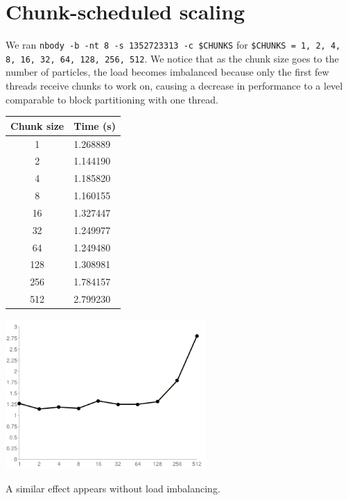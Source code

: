 \documentclass{article}[12pt;letterpaper]
\begin{document}
\section{Chunk-scheduled scaling}

We ran \texttt{nbody -b -nt 8 -s 1352723313 -c \$CHUNKS} for \texttt{\$CHUNKS =
1, 2, 4, 8, 16, 32, 64, 128, 256, 512}. We notice that as the chunk size goes
to the number of particles, the load becomes imbalanced because only the first
few threads receive chunks to work on, causing a decrease in performance to a
level comparable to block partitioning with one thread.

\begin{center}\begin{tabular}{c l}
Chunk size & Time (s) \\
\hline{}
  1 & 1.268889 \\
  2 & 1.144190 \\
  4 & 1.185820 \\
  8 & 1.160155 \\
 16 & 1.327447 \\
 32 & 1.249977 \\
 64 & 1.249480 \\
128 & 1.308981 \\
256 & 1.784157 \\
512 & 2.799230
\end{tabular}

\includegraphics[width=3in]{a2_sec2_1.png}
\end{center}

A similar effect appears without load imbalancing.
\end{document}

